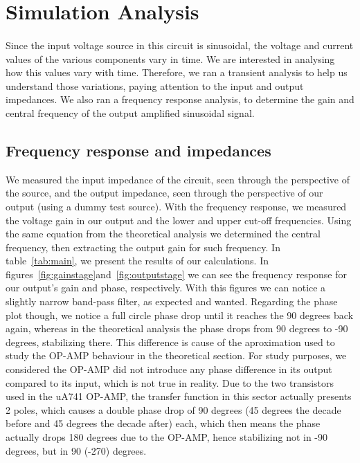 \section{Simulation Analysis}
\label{sec:simulation}

\paragraph{} Since the input voltage source in this circuit is sinusoidal, the voltage and current values of the various components vary in time. We are interested in analysing how this values vary with time.
Therefore, we ran a transient analysis to help us understand those variations, paying attention to the input and output impedances. We also ran a frequency response analysis, to determine the gain and 
central frequency of the output amplified sinusoidal signal.

\subsection{Frequency response and impedances}
We measured the input impedance of the circuit, seen through the perspective of the source, and the output impedance, seen through the perspective of our output 
(using a dummy test source). With the frequency response, we measured the voltage gain in our output and the lower and upper cut-off frequencies. 
Using the same equation from the theoretical analysis we determined the central frequency, then extracting the output gain for such frequency. In table~\ref{tab:main}, we present the 
results of our calculations. In figures~\ref{fig:gainstage}and~\ref{fig:outputstage} we can see the frequency response for our output's gain and phase, respectively. With this figures we
 can notice a slightly narrow band-pass filter, as expected and wanted. Regarding the phase plot though, we notice a full circle phase drop until it reaches the 90 degrees back again, 
whereas in the theoretical analysis the phase drops from 90 degrees to -90 degrees, stabilizing there. This difference is cause of the aproximation used to study the OP-AMP behaviour 
in the theoretical section. For study purposes, we considered the OP-AMP did not introduce any phase difference in its output compared to its input, which is not true in reality. Due to the two 
transistors used in the uA741 OP-AMP, the transfer function in this sector actually presents 2 poles, which causes a double phase drop of 90 degrees (45 degrees the decade before and 45 degrees 
the decade after) each, which then means the phase actually drops 180 degrees due to the OP-AMP, hence stabilizing not in -90 degrees, but in 90 (-270) degrees.

